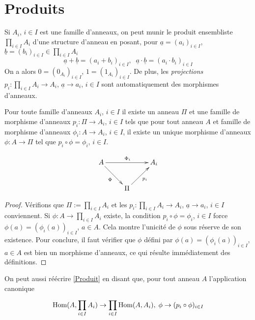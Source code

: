 \section{Produits}\label{Produit (Anneaux)}\label{Produit}

Si $A_i$, $i\in I$ est une famille d'anneaux, on peut munir le produit
ensembliste $\prod_{i\in I}A_i$ d'une structure d'anneau en posant, pour
$\underline{a}=(a_i)_{i\in I}$, $\underline{b}=(b_i)_{i\in I}\in \prod_{i\in
I}A_i$ $$\underline{a}+\underline{b}=(a_i+b_i)_{i\in I},\;\; \underline{a}\cdot
\underline{b}=(a_i\cdot b_i)_{i\in I}$$ On a alors $0 =(0_{A_i})_{i\in I}$, $1
=(1_{A_i})_{i\in I}$. De plus, les \emph{projections} $p_i:\prod_{i\in
I}A_i\rightarrow A_i$, $\underline{a}\rightarrow a_i$, $i\in I$ sont
automatiquement des morphismes d'anneaux.

\begin{proposition}
    Pour toute famille d'anneaux $A_i$, $i\in I$ il existe un anneau $\Pi$ et
    une famille de morphisme d'anneaux $p_i:\Pi\rightarrow A_i$, $i\in I$ tels
    que pour tout anneau $A$ et famille de morphisme d'anneaux
    $\phi_i:A\rightarrow A_i$, $i\in I$, il existe un unique morphisme
    d'anneaux $\phi:A\rightarrow \Pi$ tel que $p_i\circ \phi=\phi_i$, $i\in I$.

    \[\xymatrix{ A \ar[rr]^{\Phi_i} \ar[rd]_\Phi && A_i \\ & \Pi
    \ar[ru]_{p_i}}\]
\end{proposition}

\begin{proof}
    Vérifions que $\Pi:= \prod_{i\in I}A_i$ et les $p_i:\prod_{i\in
    I}A_i\rightarrow A_i$, $\underline{a}\rightarrow a_i$, $i\in I$
    conviennent. Si $\phi:A\rightarrow \prod_{i\in I}A_i$ existe, la condition
    $p_i\circ \phi =\phi_i$, $i\in I$ force  $\phi(a)=(\phi_i(a))_{i\in I}$,
    $a\in A$. Cela montre l'unicité de $\phi$  sous réserve de son existence.
    Pour conclure, il faut vérifier que $\phi$ défini par
    $\phi(a)=(\phi_i(a))_{i\in I}$, $a\in A$ est bien un morphisme d'anneaux,
    ce qui résulte immédiatement des définitions.
\end{proof}

On peut aussi réécrire \ref{Produit} en disant que, pour tout anneau $A$
l'application canonique

\[\hbox{\rm Hom}(A,\prod_{i\in I}A_{i})\rightarrow \prod_{i\in I}\hbox{\rm Hom}
(A,A_{i}), \; \phi\rightarrow (p_i\circ \phi)_{i\in I}\]


